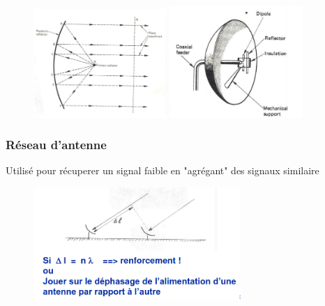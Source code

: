 		\begin{figure}[H]
			\centering
			\includegraphics[width=0.45\textwidth]{img/parabole.png}
			\includegraphics[width=0.45\textwidth]{img/parabole2.png}
		\end{figure}
	\subsubsection{Réseau d'antenne}
		Utilisé pour récuperer un signal faible en "agrégant" des signaux similaire
		\begin{figure}[H]
			\centering
			\includegraphics[width=0.7\textwidth]{img/reseauAntennes.png}
		\end{figure}
